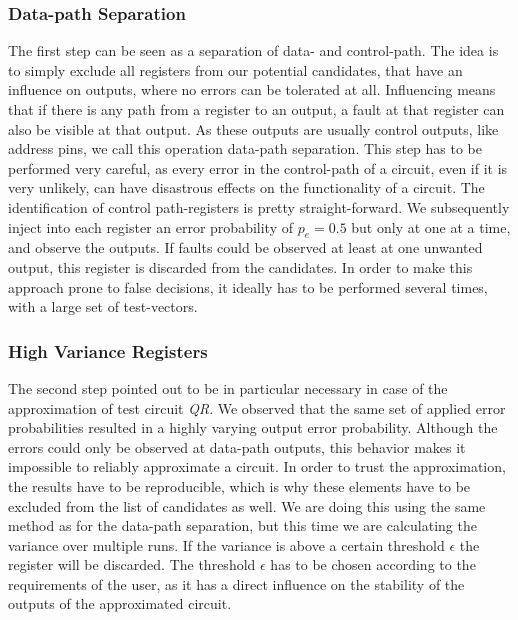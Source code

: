 \documentclass[conference]{IEEEtran}
\begin{document}
\subsubsection{Data-path Separation}
The first step can be seen as a separation of data- and control-path. The idea is to simply exclude all registers from our potential candidates, that have an influence on outputs, where no errors can be tolerated at all. Influencing means that if there is any path from a register to an output, a fault at that register can also be visible at that output. As these outputs are usually control outputs, like address pins, we call this operation data-path separation. This step has to be performed very careful, as every error in the control-path of a circuit, even if it is very unlikely, can have disastrous effects on the functionality of a circuit. The identification of control path-registers is pretty straight-forward. We subsequently inject into each register an error probability of $p_e=0.5$ but only at one at a time, and observe the outputs. If faults could be observed at least at one unwanted output, this register is discarded from the candidates. In order to make this approach prone to false decisions, it ideally has to be performed several times, with a large set of test-vectors.
\subsubsection{High Variance Registers}
\label{subsubsec:high_v}
The second step pointed out to be in particular necessary in case of the approximation of test circuit \emph{QR}. We observed that the same set of applied error probabilities resulted in a highly varying output error probability. Although the errors could only be observed at data-path outputs, this behavior makes it impossible to reliably approximate a circuit. In order to trust the approximation, the results have to be reproducible, which is why these elements have to be excluded from the list of candidates as well. We are doing this using the same method as for the data-path separation, but this time we are calculating the variance over multiple runs. If the variance is above a certain threshold $\epsilon$ the register will be discarded. The threshold $\epsilon$ has to be chosen according to the requirements of the user, as it has a direct influence on the stability of the outputs of the approximated circuit.
\end{document}
